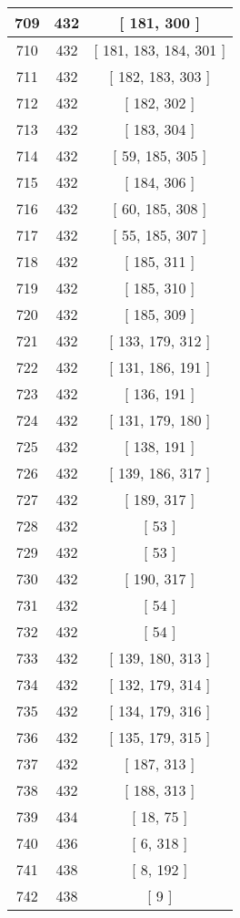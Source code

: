 \begin{center}
\begin{longtable}[H]{|| c c c ||}
\hline
709 & 432 & [ 181, 300 ] \\ 
\hline
710 & 432 & [ 181, 183, 184, 301 ] \\ 
\hline
711 & 432 & [ 182, 183, 303 ] \\ 
\hline
712 & 432 & [ 182, 302 ] \\ 
\hline
713 & 432 & [ 183, 304 ] \\ 
\hline
714 & 432 & [ 59, 185, 305 ] \\ 
\hline
715 & 432 & [ 184, 306 ] \\ 
\hline
716 & 432 & [ 60, 185, 308 ] \\ 
\hline
717 & 432 & [ 55, 185, 307 ] \\ 
\hline
718 & 432 & [ 185, 311 ] \\ 
\hline
719 & 432 & [ 185, 310 ] \\ 
\hline
720 & 432 & [ 185, 309 ] \\ 
\hline
721 & 432 & [ 133, 179, 312 ] \\ 
\hline
722 & 432 & [ 131, 186, 191 ] \\ 
\hline
723 & 432 & [ 136, 191 ] \\ 
\hline
724 & 432 & [ 131, 179, 180 ] \\ 
\hline
725 & 432 & [ 138, 191 ] \\ 
\hline
726 & 432 & [ 139, 186, 317 ] \\ 
\hline
727 & 432 & [ 189, 317 ] \\ 
\hline
728 & 432 & [ 53 ] \\ 
\hline
729 & 432 & [ 53 ] \\ 
\hline
730 & 432 & [ 190, 317 ] \\ 
\hline
731 & 432 & [ 54 ] \\ 
\hline
732 & 432 & [ 54 ] \\ 
\hline
733 & 432 & [ 139, 180, 313 ] \\ 
\hline
734 & 432 & [ 132, 179, 314 ] \\ 
\hline
735 & 432 & [ 134, 179, 316 ] \\ 
\hline
736 & 432 & [ 135, 179, 315 ] \\ 
\hline
737 & 432 & [ 187, 313 ] \\ 
\hline
738 & 432 & [ 188, 313 ] \\ 
\hline
739 & 434 & [ 18, 75 ] \\ 
\hline
740 & 436 & [ 6, 318 ] \\ 
\hline
741 & 438 & [ 8, 192 ] \\ 
\hline
742 & 438 & [ 9 ] \\ 

\end{longtable}
\end{center}
